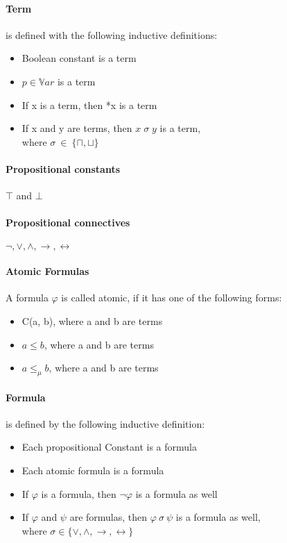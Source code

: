 \documentclass{article}
\begin{document}
	\paragraph{Term} 
is defined with the following inductive definitions:
	\label{sec:term-inductive-definition}
		\begin{itemize}
			\item Boolean constant is a term
			\item $p \in \mathbb{V}ar$ is a term
			\item If x is a term, then *x is a term
			\item If x and y are terms, then $x \; \sigma \; y $ is a term,\\
				where $\sigma \: \in \: \{\sqcap, \sqcup\}$
		\end{itemize}	

	\paragraph{Propositional constants}
$\top$ and $\bot$ 

	\paragraph{Propositional connectives} 
$\neg, \vee, \wedge, \rightarrow, \leftrightarrow$

	\paragraph{Atomic Formulas}
		A formula $\varphi$ is called atomic, if it has one of the following forms:
		\begin{itemize}
			\item C(a, b), where a and b are terms
			\item $a \le b$, where a and b are terms
			\item $a \le_\mu b$, where a and b are terms
		\end{itemize}

	\paragraph{Formula}
is defined by the following inductive definition:
	\label{sec:formula-inductive-definition}
		\begin{itemize}
			\item Each propositional Constant is a formula
			\item Each atomic formula is a formula 
			\item If $\varphi$ is a formula, then $\neg{\varphi}$ is a formula as well
			\item If $\varphi$ and $\psi$ are formulas, then $\varphi \: \sigma \: \psi $ is a formula as well,\\
				where $\sigma \in \{\vee, \wedge, \rightarrow, \leftrightarrow\}$
		\end{itemize}
\end{document}
